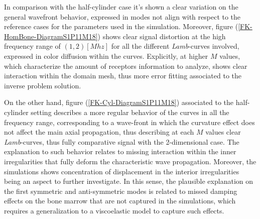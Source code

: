In comparison with the half-cylinder case it's shown a clear variation on the general wavefront behavior, expressed in modes not align with respect to the reference cases for the parameters used in the simulation. Moreover, figure (\ref{FK-HomBone-DiagramS1P11M18}) shows clear signal distortion at the high frequency range of $(1, 2) [Mhz]$ for all the different \textit{Lamb}-curves involved, expressed in color diffusion within the curves. Explicitly, at higher $M$ values, which characterize the amount of receptors information to analyze, shows clear interaction within the domain mesh, thus more error fitting associated to the inverse problem solution.

On the other hand, figure (\ref{FK-Cyl-DiagramS1P11M18}) associated to the half-cylinder setting describes a more regular behavior of the curves in all the frequency range, corresponding to a wave-front in which the curvature effect does not affect the main axial propagation, thus describing at each $M$ values clear \textit{Lamb}-curves, thus fully comparative signal with the 2-dimensional case. The explanation to such behavior relates to missing interaction within the inner irregularities that fully deform the characteristic wave propagation. Moreover, the simulations shows concentration of displacement in the interior irregularities being an aspect to further investigate. In this sense, the plausible explanation on the first symmetric and anti-symmetric modes is related to missed damping effects on the bone marrow that are not captured in the simulations, which requires a generalization to a viscoelastic model to capture such effects.


